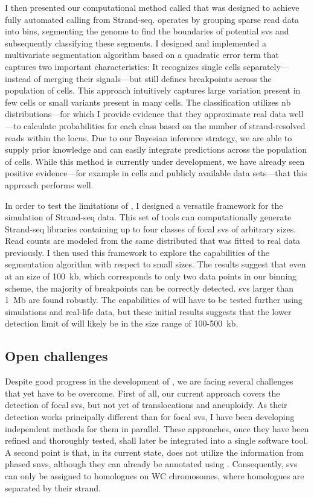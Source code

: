 I then presented our computational method called \mc that was designed to achieve
fully automated \sv calling from Strand-seq. \mc operates by grouping sparse
read data into bins, segmenting the genome to find the boundaries of potential
\acp{sv} and subsequently classifying these segments. I designed and implemented
a multivariate segmentation algorithm based on a quadratic error term that
captures two important characteristics: It recognizes single cells
separately---instead of merging their signals---but still defines breakpoints
across the population of cells. This approach intuitively captures large
variation present in few cells or small variants present in many cells. The \sv
classification utilizes \acl{nb} distributions---for which I provide evidence
that they approximate real data well---to calculate probabilities for each \sv
class based on the number of strand-resolved reads within the locus.
Due to our Bayesian inference strategy, we are able to supply prior knowledge
and can easily integrate \sv predictions across the population of cells. While
this method is currently under development, we have already seen positive
evidence---for example in \rpe cells and publicly available data sets---that this
approach performs well.

In order to test the limitations of \mc, I designed a versatile framework for
the simulation of Strand-seq data. This set of tools can computationally generate
Strand-seq libraries containing up to four classes of focal \acp{sv} of arbitrary
sizes. Read counts are modeled from the same \nb distributed that was fitted to
real data previously. I then used this framework to explore the capabilities of
the segmentation algorithm with respect to small \sv sizes. The results suggest that
even at an \sv size of 100~kb, which corresponds to only two data points in our
binning scheme, the majority of breakpoints can be correctly detected.
\Acp{sv} larger than 1~Mb are found robustly. The capabilities of \mc will have
to be tested further using simulations and real-life data, but these initial
results suggests that the lower detection limit of \mc will likely be in the
size range of 100-500~kb.




\subsection{Open challenges}
\label{sec:mosaic_challenges}

Despite good progress in the development of \mc, we are facing several
challenges that yet have to be overcome. First of all, our current approach
covers the detection of focal \acp{sv}, but not yet of translocations and
aneuploidy. As their detection works principally different than for focal \acp{sv},
I have been developing independent methods for them in parallel. These approaches,
once they have been refined and thoroughly tested, shall later be integrated into a
single software tool. A second point is that, in its current state, \mc does not
utilize the information from phased \acp{snv}, although they can already be
annotated using \strandphaser. Consequently, \acp{sv} can only be assigned
to homologues on WC chromosomes, where homologues are separated by their strand.

